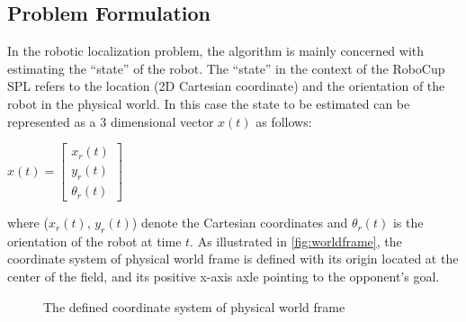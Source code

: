 \subsection{Problem Formulation}\label{sub:problem}
In the robotic localization problem, the algorithm is mainly concerned with estimating the ``state'' of the robot. The ``state'' in the context of the RoboCup \gls{SPL} refers to the location (2D Cartesian coordinate) and the orientation of the robot in the physical world. In this case the state to be estimated can be represented as a 3 dimensional vector $x(t)$ as follows:
\begin{center}
$x(t) =
 \begin{bmatrix}
  x_{r}(t) \\
  y_{r}(t) \\
  \theta_{r}(t) 
 \end{bmatrix} $ \\
\end{center}
where ($x_{r}(t)$, $y_{r}(t)$) denote the Cartesian coordinates and $\theta_{r}(t)$ is the orientation of the robot at time $t$. As illustrated in \autoref{fig:worldframe}, the coordinate system of physical world frame is defined with its origin located at the center of the field, and its positive x-axis axle pointing to the opponent's goal.
\begin{figure}[h]
  \centering
  \caption{The defined coordinate system of physical world frame}
  \label{fig:worldframe}
\end{figure}

